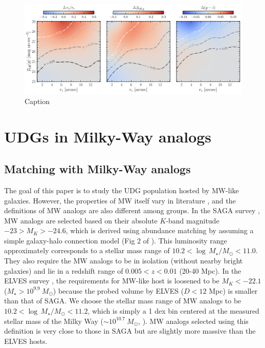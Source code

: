 \documentclass[twocolumn,astrosymb,twocolappendix]{aastex631}
\begin{document}
\begin{CJK*}{UTF8}{gbsn}
\begin{figure}
	\vbox{ 
		\centering
		\includegraphics[width=1\linewidth]{meas_error_spergel.pdf}
	}
    \caption{Caption}
    \label{fig:meas_err}
\end{figure}

\section{UDGs in Milky-Way analogs}

\subsection{Matching with Milky-Way analogs}\label{sec:match}
The goal of this paper is to study the UDG population hosted by MW-like galaxies. However, the properties of MW itself vary in literature \citep{Licquia2015,Bland-Hawthorn2016}, and the definitions of MW analogs are also different among groups. In the SAGA survey \citep{SAGA-I,SAGA-II}, MW analogs are selected based on their absolute $K$-band magnitude $-23 > M_K > -24.6$, which is derived using abundance matching by assuming a simple galaxy-halo connection model (Fig 2 of \citealt{SAGA-I}). This luminosity range approximately corresponds to a stellar mass range of $10.2 < \log\, M_\star/M_\odot < 11.0$. They also require the MW analogs to be in isolation (without nearby bright galaxies) and lie in a redshift range of $0.005 < z < 0.01$ (20-40 Mpc). In the ELVES survey \citep{ELVES-I,ELVES-II,CarlstenELVES2022}, the requirements for MW-like host is loosened to be $M_K < -22.1$ ($M_\star > 10^{9.9}\ M_\odot$) because the probed volume by ELVES ($D<12$ Mpc) is smaller than that of SAGA. We choose the stellar mass range of MW analogs to be $10.2 < \log\, M_\star/M_\odot < 11.2$, which is simply a 1 dex bin centered at the measured stellar mass of the Milky Way ($\sim 10^{10.7}\ M_\odot$, \citealt{Licquia2015}). MW analogs selected using this definition is very close to those in SAGA but are slightly more massive than the ELVES hosts.


\end{CJK*}
\end{document}
